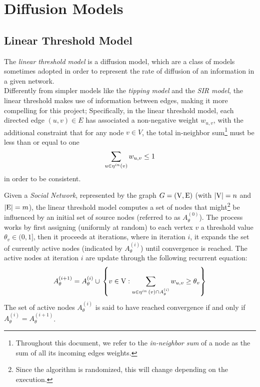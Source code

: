 \section{Diffusion Models}
\subsection{Linear Threshold Model}\label{sec:ltm}
The \textit{linear threshold model} \cite{diffusion} is a diffusion model, which are a class of models sometimes adopted in order to represent the rate of diffusion of an information in a given network.\\
Differently from simpler models like the \textit{tipping model} and the \textit{SIR model}, the linear threshold makes use of information between edges, making it more compelling for this project; Specifically, in the linear threshold model, each directed edge $(u,v) \in E$ has associated a non-negative weight $w_{u,v}$, with the additional constraint that for any node $v\in V$, the total in-neighbor sum\footnote{Throughout this document, we refer to the \textit{in-neighbor sum} of a node as the sum of all its incoming edges weights.} must be less than or equal to one
\begin{equation}\label{eq:linear_threshold_constraint} 
    \sum_{u\in \mathop{\eta^{in}} (v)} w_{u,v}\le 1
\end{equation}
in order to be consistent.

Given a \textit{Social Network}, represented by the graph $G=(\mathrm{V},\mathrm{E})$ (with $|\mathrm{V}|=n$ and $|\mathrm{E}|=m$), the linear threshold model computes a set of nodes that might\footnote{Since the algorithm is randomized, this will change depending on the execution.} be influenced by an initial set of source nodes (referred to as $A_\theta^{(0)}$). The process works by first assigning (uniformly at random) to each vertex $v$ a threshold value $\theta_v\in(0,1]$, then it proceeds at iterations, where in iteration $i$, it expands the set of currently active nodes (indicated by $A_\theta^{(i)}$) until convergence is reached.  The active nodes at iteration $i$ are update through  the following recurrent equation:
$$
A^{(i+1)}_{\theta}=A^{(i)}_{\theta}\cup{}\left\{v\in \mathrm{V} : \sum_{u\in\mathop{\eta^{in}}{}(v)\cap A^{(i)}_{\theta}} w_{u,v}\ge \theta_v\right\}
$$
The set of active nodes $A^{(i)}_\theta$ is said to have reached convergence if and only if $A_\theta^{(i)} = A_\theta^{(i+1)}$.

